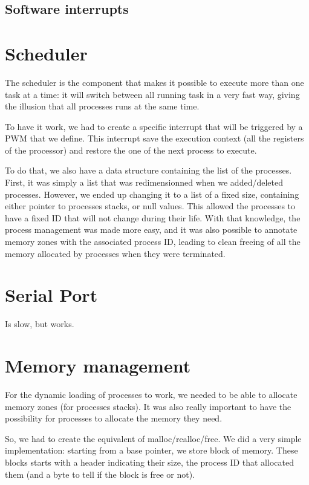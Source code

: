 \documentclass[openany, a4paper]{book}
\begin{document}
      \subsection{Software interrupts}

    \section{Scheduler}
      The scheduler is the component that makes it possible to execute more than
      one task at a time: it will switch between all running task in a very fast
      way, giving the illusion that all processes runs at the same time.

      To have it work, we had to create a specific interrupt that will be
      triggered by a PWM that we define. This interrupt save the execution
      context (all the registers of the processor) and restore the one of the
      next process to execute.

      To do that, we also have a data structure containing the list of the
      processes. First, it was simply a list that was redimensionned when we
      added/deleted processes.  However, we ended up changing it to a list of a
      fixed size, containing either pointer to processes stacks, or null values.
      This allowed the processes to have a fixed ID that will not change during
      their life.  With that knowledge, the process management was made more
      easy, and it was also possible to annotate memory zones with the
      associated process ID, leading to clean freeing of all the memory
      allocated by processes when they were terminated.

    \section{Serial Port}
      Is slow, but works.

    \section{Memory management}
      For the dynamic loading of processes to work, we needed to be able to
      allocate memory zones (for processes stacks). It was also really important
      to have the possibility for processes to allocate the memory they need.

      So, we had to create the equivalent of malloc/realloc/free. We did a very
      simple implementation: starting from a base pointer, we store block of
      memory. These blocks starts with a header indicating their size, the
      process ID that allocated them (and a byte to tell if the block is free or
      not).
\end{document}
